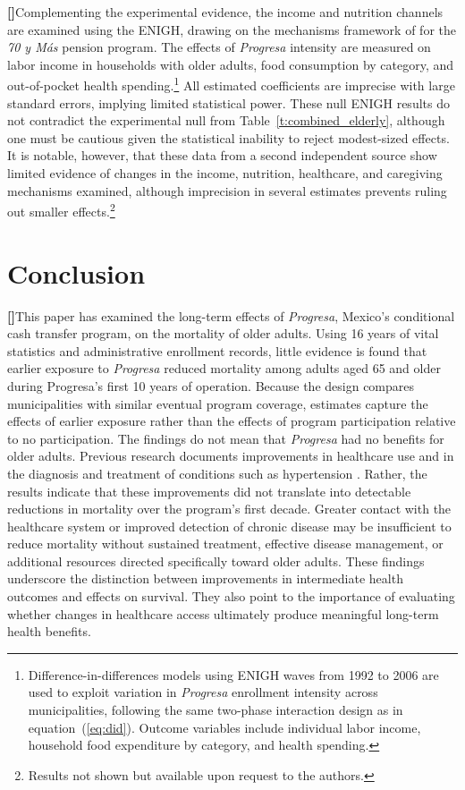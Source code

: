 \documentclass[12pt]{article}
\newcounter{paragraphnum}
\newcommand{\p}{\refstepcounter{paragraphnum}\textbf{[\theparagraphnum]}\enspace}
\begin{document}
\p Complementing the experimental evidence, the income and nutrition channels are examined using the ENIGH, drawing on the mechanisms framework of \cite{Menares2026JHR} for the \textit{70 y Más} pension program. The effects of \textit{Progresa} intensity are measured on labor income in households with older adults, food consumption by category, and out-of-pocket health spending.\footnote{Difference-in-differences models using ENIGH waves from 1992 to 2006 are used to exploit variation in \textit{Progresa} enrollment intensity across municipalities, following the same two-phase interaction design as in equation~(\ref{eq:did}). Outcome variables include individual labor income, household food expenditure by category, and health spending.} All estimated coefficients are imprecise with large standard errors, implying limited statistical power. These null ENIGH results do not contradict the experimental null from Table~\ref{t:combined_elderly}, although one must be cautious given the statistical inability to reject modest-sized effects. It is notable, however, that these data from a second independent source show limited evidence of changes in the income, nutrition, healthcare, and caregiving mechanisms examined, although imprecision in several estimates prevents ruling out smaller effects.\footnote{Results not shown but available upon request to the authors.}


\section{Conclusion}\label{s:conclusion}

\p This paper has examined the long-term effects of \textit{Progresa}, Mexico's conditional cash transfer program, on the mortality of older adults. Using 16 years of vital statistics and administrative enrollment records, little evidence is found that earlier exposure to \textit{Progresa} reduced mortality among adults aged 65 and older during Progresa's first 10 years of operation. Because the design compares municipalities with similar eventual program coverage, estimates capture the effects of earlier exposure rather than the effects of program participation relative to no participation. The findings do not mean that \textit{Progresa} had no benefits for older adults. Previous research documents improvements in healthcare use and in the diagnosis and treatment of conditions such as hypertension \citep{BehrmanParker2013Demography, aguila2024conditional}. Rather, the results indicate that these improvements did not translate into detectable reductions in mortality over the program’s first decade. Greater contact with the healthcare system or improved detection of chronic disease may be insufficient to reduce mortality without sustained treatment, effective disease management, or additional resources directed specifically toward older adults. These findings underscore the distinction between improvements in intermediate health outcomes and effects on survival. They also point to the importance of evaluating whether changes in healthcare access ultimately produce meaningful long-term health benefits.
\end{document}
